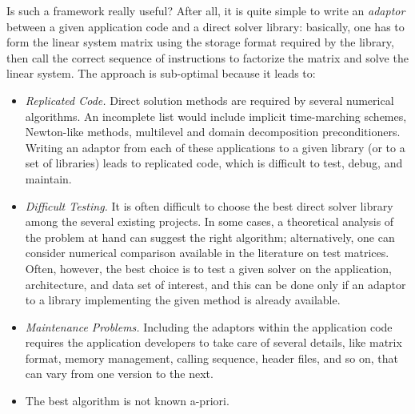 \documentclass[acmtocl]{acmtrans2m}
\begin{document}
Is such a framework really useful? After all, it is quite simple to 
write an {\sl adaptor} between a given application code and a direct solver
library: basically, one
has to form the linear system matrix using the storage format required by the
library, then call the correct sequence of instructions to factorize the matrix
and solve the linear system.  The approach is sub-optimal because it leads to:
\begin{itemize}

\item 
{\sl Replicated Code.}
Direct solution methods are required by several numerical algorithms. An
incomplete list would include
implicit time-marching schemes, 
Newton-like methods, multilevel and domain decomposition preconditioners.
Writing an adaptor from each of these applications to a given library  
(or to a  set of libraries) leads to replicated code, which is difficult
to test, debug, and maintain.

\item 
{\sl Difficult Testing.}
It is often difficult to choose the best direct solver library among the
several existing projects.  In some cases, a theoretical analysis of
the problem at hand can suggest the right algorithm; alternatively, one can
consider numerical comparison available in the literature
on test matrices. Often, however, the best
choice is to test a given solver on the application, architecture, and data
set of interest, and this can be done only if an adaptor  to a library
implementing the given method is already available.

\item 
{\sl Maintenance Problems.}
Including the adaptors within the application code requires the application
developers to take care of several details, like matrix format, memory
management, calling sequence, header files, and so on, that can vary 
from one version to the next. 

\item The best algorithm is not known a-priori.
\end{itemize}
\end{document}
